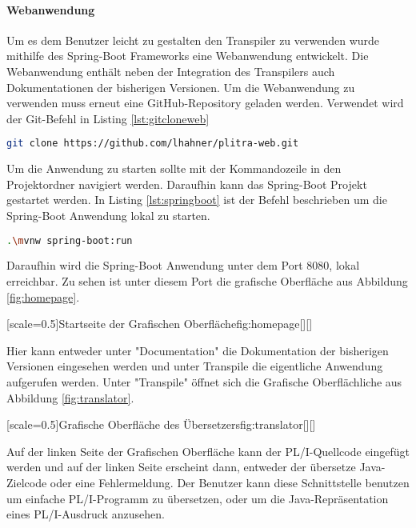\paragraph{Webanwendung}
Um es dem Benutzer leicht zu gestalten den Transpiler zu verwenden wurde mithilfe des Spring-Boot Frameworks eine Webanwendung entwickelt.
Die Webanwendung enthält neben der Integration des Transpilers auch Dokumentationen der bisherigen Versionen.
Um die Webanwendung zu verwenden muss erneut eine GitHub-Repository geladen werden. Verwendet wird der Git-Befehl in Listing
\ref{lst:gitcloneweb}

\begin{lstlisting}[language=bash, caption=Herunterladen der Repository der Web-Schnittstelle, label={lst:gitcloneweb}]
	git clone https://github.com/lhahner/plitra-web.git
\end{lstlisting}

Um die Anwendung zu starten sollte mit der Kommandozeile in den Projektordner navigiert werden.
Daraufhin kann das Spring-Boot Projekt gestartet werden. In Listing \ref{lst:springboot} ist der Befehl beschrieben um die Spring-Boot Anwendung lokal zu starten.

\begin{lstlisting}[language=bash, caption=Build Spring-Boot Projekt, label={lst:springboot}]
	.\mvnw spring-boot:run
\end{lstlisting}

Daraufhin wird die Spring-Boot Anwendung unter dem Port 8080, lokal erreichbar.
Zu sehen ist unter diesem Port die grafische Oberfläche aus Abbildung \ref{fig:homepage}.

[scale=0.5]{Startseite der Grafischen Oberfläche}{fig:homepage}[][]

Hier kann entweder unter "Documentation" die Dokumentation der bisherigen Versionen eingesehen werden und unter Transpile
die eigentliche Anwendung aufgerufen werden.
Unter "Transpile" öffnet sich die Grafische Oberflächliche aus Abbildung \ref{fig:translator}.

[scale=0.5]{Grafische Oberfläche des Übersetzers}{fig:translator}[][]

Auf der linken Seite der Grafischen Oberfläche kann der PL/I-Quellcode eingefügt werden und auf der linken Seite erscheint dann, entweder der übersetze Java-Zielcode oder eine Fehlermeldung.
Der Benutzer kann diese Schnittstelle benutzen um einfache PL/I-Programm zu übersetzen, oder um die Java-Repräsentation eines PL/I-Ausdruck anzusehen.

